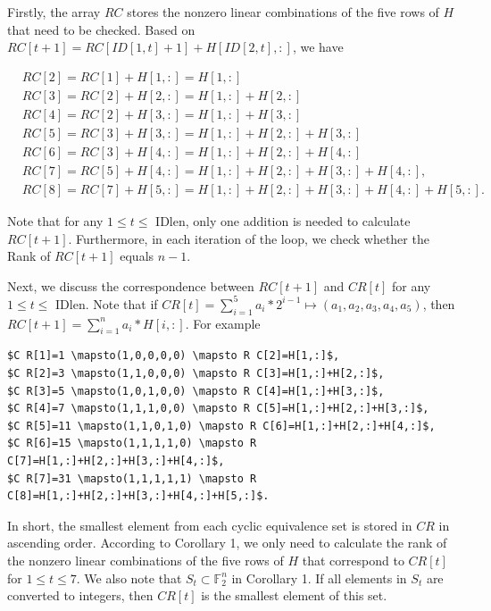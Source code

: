 \documentclass[10pt]{article}
\begin{document}
Firstly, the array $R C$ stores the nonzero linear combinations of the five rows of $H$ that need to be checked. Based on $R C[t+1]=R C[I D[1, t]+1]+H[I D[2, t],:]$, we have

$$
\begin{aligned}
& R C[2]=R C[1]+H[1,:]=H[1,:] \\
& R C[3]=R C[2]+H[2,:]=H[1,:]+H[2,:] \\
& R C[4]=R C[2]+H[3,:]=H[1,:]+H[3,:] \\
& R C[5]=R C[3]+H[3,:]=H[1,:]+H[2,:]+H[3,:] \\
& R C[6]=R C[3]+H[4,:]=H[1,:]+H[2,:]+H[4,:] \\
& R C[7]=R C[5]+H[4,:]=H[1,:]+H[2,:]+H[3,:]+H[4,:], \\
& R C[8]=R C[7]+H[5,:]=H[1,:]+H[2,:]+H[3,:]+H[4,:]+H[5,:] .
\end{aligned}
$$

Note that for any $1 \leq t \leq$ IDlen, only one addition is needed to calculate $R C[t+1]$. Furthermore, in each iteration of the loop, we check whether the Rank of $R C[t+1]$ equals $n-1$.

Next, we discuss the correspondence between $R C[t+1]$ and $C R[t]$ for any $1 \leq t \leq$ IDlen. Note that if $C R[t]=\sum_{i=1}^{5} a_{i} * 2^{i-1} \mapsto\left(a_{1}, a_{2}, a_{3}, a_{4}, a_{5}\right)$, then $R C[t+1]=\sum_{i=1}^{n} a_{i} * H[i,:]$. For example

\begin{verbatim}
$C R[1]=1 \mapsto(1,0,0,0,0) \mapsto R C[2]=H[1,:]$,
$C R[2]=3 \mapsto(1,1,0,0,0) \mapsto R C[3]=H[1,:]+H[2,:]$,
$C R[3]=5 \mapsto(1,0,1,0,0) \mapsto R C[4]=H[1,:]+H[3,:]$,
$C R[4]=7 \mapsto(1,1,1,0,0) \mapsto R C[5]=H[1,:]+H[2,:]+H[3,:]$,
$C R[5]=11 \mapsto(1,1,0,1,0) \mapsto R C[6]=H[1,:]+H[2,:]+H[4,:]$,
$C R[6]=15 \mapsto(1,1,1,1,0) \mapsto R C[7]=H[1,:]+H[2,:]+H[3,:]+H[4,:]$,
$C R[7]=31 \mapsto(1,1,1,1,1) \mapsto R C[8]=H[1,:]+H[2,:]+H[3,:]+H[4,:]+H[5,:]$.
\end{verbatim}

In short, the smallest element from each cyclic equivalence set is stored in $C R$ in ascending order. According to Corollary 1, we only need to calculate the rank of the nonzero linear combinations of the five rows of $H$ that correspond to $C R[t]$ for $1 \leq t \leq 7$. We also note that $S_{t} \subset \mathbb{F}_{2}^{n}$ in Corollary 1. If all elements in $S_{t}$ are converted to integers, then $C R[t]$ is the smallest element of this set.
\end{document}
